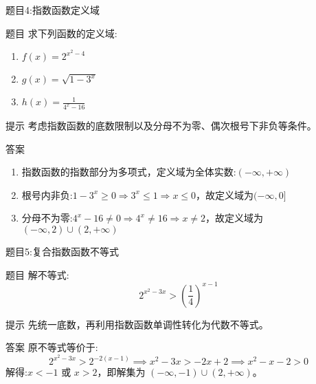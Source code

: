   
  
  
  \begin{frame}{题目4:指数函数定义域}
    \begin{block}{题目}
        求下列函数的定义域:
        \begin{enumerate}
            \item $f(x) = 2^{x^2 - 4}$
            \item $g(x) = \sqrt{1 - 3^x}$
            \item $h(x) = \frac{1}{4^x - 16}$
        \end{enumerate}
    \end{block}
    
    \begin{alertblock}{提示}
        考虑指数函数的底数限制以及分母不为零、偶次根号下非负等条件。
    \end{alertblock}
    
    \pause
    
    \begin{block}{答案}
        \begin{enumerate}
            \item 指数函数的指数部分为多项式，定义域为全体实数:$(-\infty, +\infty)$
            \item 根号内非负:$1 - 3^x \geq 0 \Rightarrow 3^x \leq 1 \Rightarrow x \leq 0$，故定义域为$(-\infty, 0]$
            \item 分母不为零:$4^x - 16 \neq 0 \Rightarrow 4^x \neq 16 \Rightarrow x \neq 2$，故定义域为$(-\infty, 2) \cup (2, +\infty)$
        \end{enumerate}
    \end{block}
  \end{frame}
  
  
  
  
  
  
  
  \begin{frame}{题目5:复合指数函数不等式}
    \begin{block}{题目}
        解不等式:
        \[
        2^{x^2 - 3x} > \left(\frac{1}{4}\right)^{x - 1}
        \]
    \end{block}
    
    \begin{alertblock}{提示}
        先统一底数，再利用指数函数单调性转化为代数不等式。
    \end{alertblock}
    
    \pause
    
    \begin{block}{答案}
        原不等式等价于:
        \[
        2^{x^2 - 3x} > 2^{-2(x - 1)} \implies x^2 - 3x > -2x + 2 \implies x^2 - x - 2 > 0
        \]
        解得:$x < -1$ 或 $x > 2$，即解集为 $(-\infty, -1) \cup (2, +\infty)$。
    \end{block}
  \end{frame}
  
